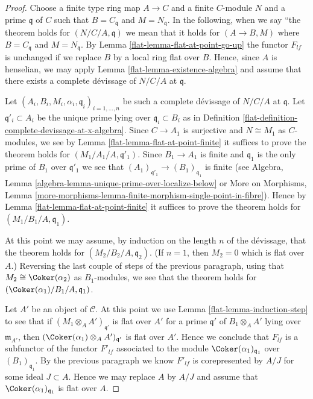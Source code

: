 \begin{proof}

Choose a finite type ring map $A \to C$ and a finite $C$-module $N$
and a prime $\mathfrak q$ of $C$ such that $B = C_{\mathfrak q}$
and $M = N_{\mathfrak q}$. In the following, when we say
``the theorem holds for $(N/C/A, \mathfrak q)$ we mean that
it holds for $(A \to B, M)$ where $B = C_{\mathfrak q}$ and
$M = N_{\mathfrak q}$. By
Lemma \ref{flat-lemma-flat-at-point-go-up}
the functor $F_{lf}$ is unchanged if we replace $B$ by a local ring
flat over $B$. Hence, since $A$ is henselian, we may apply
Lemma \ref{flat-lemma-existence-algebra}
and assume that there exists a complete d\'evissage of
$N/C/A$ at $\mathfrak q$.

\medskip\noindent
Let $(A_i, B_i, M_i, \alpha_i, \mathfrak q_i)_{i = 1, \ldots, n}$
be such a complete d\'evissage of $N/C/A$ at $\mathfrak q$. Let
$\mathfrak q'_i \subset A_i$ be the unique prime lying over
$\mathfrak q_i \subset B_i$ as in
Definition \ref{flat-definition-complete-devissage-at-x-algebra}.
Since $C \to A_1$ is surjective and $N \cong M_1$ as $C$-modules,
we see by
Lemma \ref{flat-lemma-flat-at-point-finite}
it suffices to prove the theorem holds for $(M_1/A_1/A, \mathfrak q'_1)$.
Since $B_1 \to A_1$ is finite and $\mathfrak q_1$ is the only prime
of $B_1$ over $\mathfrak q'_1$ we see that
$(A_1)_{\mathfrak q'_1} \to (B_1)_{\mathfrak q_1}$ is finite (see
Algebra, Lemma \ref{algebra-lemma-unique-prime-over-localize-below} or
More on Morphisms,
Lemma \ref{more-morphisms-lemma-finite-morphism-single-point-in-fibre}).
Hence by
Lemma \ref{flat-lemma-flat-at-point-finite}
it suffices to prove the theorem holds for $(M_1/B_1/A, \mathfrak q_1)$.

\medskip\noindent
At this point we may assume, by induction on the length $n$ of the
d\'evissage, that the theorem holds for $(M_2/B_2/A, \mathfrak q_2)$.
(If $n = 1$, then $M_2 = 0$ which is flat over $A$.)
Reversing the last couple of steps of the previous paragraph, using
that $M_2 \cong \Coker(\alpha_2)$ as $B_1$-modules, we see
that the theorem holds for $(\Coker(\alpha_1)/B_1/A, \mathfrak q_1)$.

\medskip\noindent
Let $A'$ be an object of $\mathcal{C}$. At this point we use
Lemma \ref{flat-lemma-induction-step}
to see that if $(M_1 \otimes_A A')_{\mathfrak q'}$ is flat
over $A'$ for a prime $\mathfrak q'$ of $B_1 \otimes_A A'$
lying over $\mathfrak m_{A'}$, then
$(\Coker(\alpha_1) \otimes_A A')_{\mathfrak q'}$ is flat over $A'$.
Hence we conclude that $F_{lf}$ is a subfunctor of the
functor $F'_{lf}$ associated to the module
$\Coker(\alpha_1)_{\mathfrak q_1}$ over $(B_1)_{\mathfrak q_1}$.
By the previous paragraph we know $F'_{lf}$ is corepresented by
$A/J$ for some ideal $J \subset A$. Hence we may replace $A$ by
$A/J$ and assume that $\Coker(\alpha_1)_{\mathfrak q_1}$ is
flat over $A$.


\end{proof}
